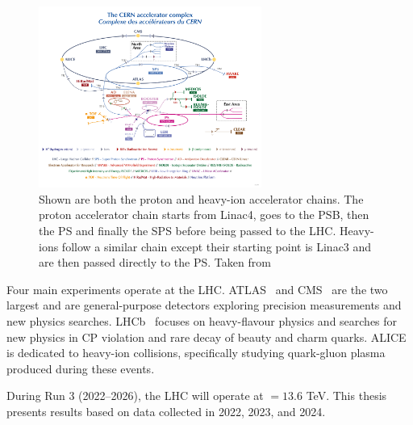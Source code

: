\begin{figure}[pht]
    \centering
    \includegraphics[width=0.65\textwidth]{figures/atlas/lhc_accelerator_chain.png}
    \caption{Shown are both the proton and heavy-ion accelerator chains. The proton accelerator chain starts from Linac4, goes to the PSB, then the PS and finally the SPS before being passed to the LHC\@. Heavy-ions follow a similar chain except their starting point is Linac3 and are then passed directly to the PS\@. Taken from~\cite{lhc_accelerator_chain_diagram}}\label{fig:lhc_accelerator_chain}
\end{figure}

Four main experiments operate at the LHC\@. ATLAS~\cite{atlas_collaboration_paper} and CMS~\cite{cms_collaboration_paper} are the two largest and are general-purpose detectors exploring precision measurements and new physics searches. LHCb~\cite{lhcb_collaboration_paper} focuses on heavy-flavour physics and searches for new physics in CP violation and rare decay of beauty and charm quarks. ALICE~\cite{alice_collaboration_paper} is dedicated to heavy-ion collisions, specifically studying quark-gluon plasma produced during these events.

During Run 3 (2022--2026), the LHC will operate at \com{} $= 13.6$ TeV. This thesis presents results based on data collected in 2022, 2023, and 2024. 
